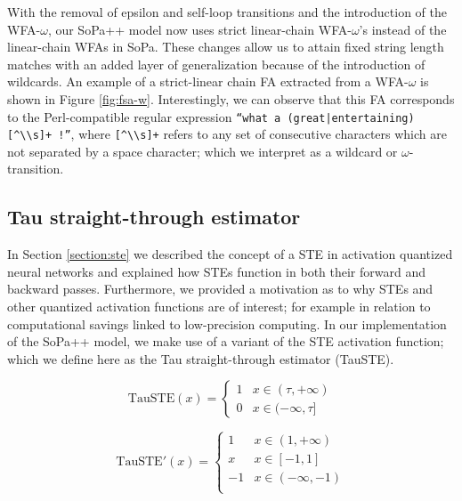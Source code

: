 With the removal of epsilon and self-loop transitions and the introduction of
the WFA-$\omega$, our SoPa++ model now uses strict linear-chain WFA-$\omega$'s
instead of the linear-chain WFAs in SoPa. These changes allow us to attain fixed
string length matches with an added layer of generalization because of the
introduction of wildcards. An example of a strict-linear chain FA extracted from
a WFA-$\omega$ is shown in Figure \ref{fig:fsa-w}. Interestingly, we can observe
that this FA corresponds to the Perl-compatible regular expression \texttt{``what a
  (great|entertaining) [\^{}\textbackslash\textbackslash s]+ !''}, where
\texttt{[\^{}\textbackslash\textbackslash s]+} refers to any set of consecutive
characters which are not separated by a space character; which we interpret as
a wildcard or $\omega$-transition.

\subsection{Tau straight-through estimator}

In Section \ref{section:ste} we described the concept of a STE in activation
quantized neural networks and explained how STEs function in both their forward
and backward passes. Furthermore, we provided a motivation as to why STEs and
other quantized activation functions are of interest; for example in relation to
computational savings linked to low-precision computing. In our implementation
of the SoPa++ model, we make use of a variant of the STE activation function;
which we define here as the Tau straight-through estimator (TauSTE).

\begin{equation}
  \label{eq:tau-ste-forward}
  \text{TauSTE}(x)=
  \begin{cases}
    1 & x \in (\tau, +\infty) \\
    0 & x \in (-\infty, \tau]
  \end{cases}
\end{equation}

\begin{equation}
  \label{eq:tau-ste-backward}
  \text{TauSTE}'(x)=
  \begin{cases}
    1 & x \in  (1, +\infty) \\
    x & x \in [-1, 1] \\
    -1 & x \in (-\infty, -1) \\
  \end{cases}
\end{equation}

